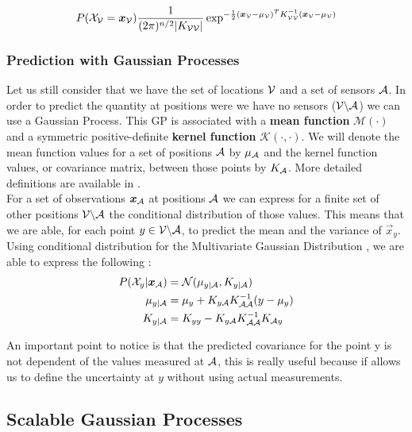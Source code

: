 \documentclass[12pt,twoside]{report}
\begin{document}
\begin{equation}
	P(\mathcal{X}_{\mathcal{V}} = {\boldsymbol{{x}}}_{\mathcal{V}}) \frac{1}{(2\pi)^{n/2} |K_{\mathcal{V}\mathcal{V}}|} \exp^{-\frac{1}{2}({\boldsymbol{{x}}}_{\mathcal{V}} - \mu_{\mathcal{V}})^T K_{\mathcal{V}\mathcal{V}}^{-1} ({\boldsymbol{{x}}}_{\mathcal{V}} - \mu_{\mathcal{V}})}
\end{equation}


\subsubsection{Prediction with Gaussian Processes}
Let us still consider that we have the set of locations $\mathcal{V}$ and a set of sensors $\mathcal{A}$. In order to predict the quantity at positions were we have no sensors ($\mathcal{V} \backslash \mathcal{A} $) we can use a Gaussian Process. This GP is associated with a \textbf{mean function} $\mathcal{M}(\cdot)$ and a symmetric positive-definite \textbf{kernel function} $\mathcal{K}(\cdot,\cdot)$. We will denote the mean function values for a set of positions $\mathcal{A}$ by $\mu_{\mathcal{A}}$ and the kernel function values, or covariance matrix, between those points by $K_{\mathcal{A}}$. More detailed definitions are available in \citet[p.~13-16]{rasmussen_gaussian_2006}. \\

For a set of observations ${\boldsymbol{{x}}}_{\mathcal{A}}$ at positions $\mathcal{A}$ we can express for a finite set of other positions $\mathcal{V} \backslash \mathcal{A} $ the conditional distribution of those values. This means that we are able, for each point $y \in \mathcal{V} \backslash \mathcal{A} $, to predict the mean and the variance of $\vec{x}_y$. Using conditional distribution for the Multivariate Gaussian Distribution \citep[p.~193]{deisenroth_mathematics_2018}, we are able to express the following : 
\begin{align}
	P(\mathcal{X}_y | {\boldsymbol{{x}}}_{\mathcal{A}} ) &= \mathcal{N}(\mu_{y | \mathcal{A}}, K_{y | \mathcal{A}}) \\
	\mu_{y | \mathcal{A}} &= \mu_y + K_{y\mathcal{A}} K_{\mathcal{A}\mathcal{A}}^{-1} (y - \mu_y)\\ 
	K_{y | \mathcal{A}} &=  K_{yy} - K_{y\mathcal{A}} K_{\mathcal{A}\mathcal{A}}^{-1} K_{\mathcal{A} y} \label{equ:covGP}
\end{align}


An important point to notice is that the predicted covariance for the point y is not dependent of the values measured at $\mathcal{A}$, this is really useful because if allows us to define the uncertainty at $y$ without using actual measurements. \\

\subsection{Scalable Gaussian Processes} 
\end{document}
